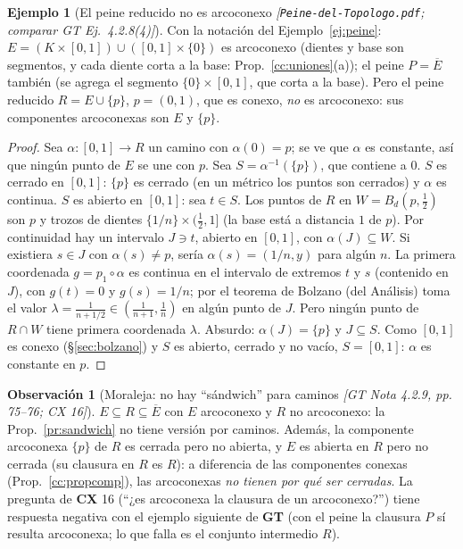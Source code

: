 \documentclass[11pt,a4paper]{article}
\theoremstyle{definition}
\newtheorem{ejemplo}[definicion]{Ejemplo}
\newtheorem{observacion}[definicion]{Observación}
\theoremstyle{plain}
\newcommand{\fnt}[1]{{\normalfont\small\itshape\color{gray!150!black}[#1]}}
\newcommand{\cl}[1]{\overline{#1}}
\newcommand{\Bola}[2]{B_d(#1,#2)}
\begin{document}
\begin{ejemplo}[El peine reducido no es arcoconexo \fnt{\texttt{Peine-del-Topologo.pdf}; comparar GT Ej.\ 4.2.8(4)}]\label{cc:peinered}
Con la notación del Ejemplo~\ref{ej:peine}: $E=(K\times[0,1])\cup([0,1]\times\{0\})$ es arcoconexo (dientes y base son segmentos, y cada diente corta a la base: Prop.~\ref{cc:uniones}(a)); el peine $P=\cl E$ también (se agrega el segmento $\{0\}\times[0,1]$, que corta a la base). Pero el peine reducido $R=E\cup\{p\}$, $p=(0,1)$, que es conexo, \emph{no} es arcoconexo: sus componentes arcoconexas son $E$ y $\{p\}$.
\end{ejemplo}

\begin{proof}
Sea $\alpha:[0,1]\to R$ un camino con $\alpha(0)=p$; se ve que $\alpha$ es constante, así que ningún punto de $E$ se une con $p$. Sea $S=\alpha^{-1}(\{p\})$, que contiene a $0$.
$S$ es cerrado en $[0,1]$: $\{p\}$ es cerrado (en un métrico los puntos son cerrados) y $\alpha$ es continua.
$S$ es abierto en $[0,1]$: sea $t\in S$. Los puntos de $R$ en $W=\Bola{p}{\frac12}$ son $p$ y trozos de dientes $\{1/n\}\times(\frac12,1]$ (la base está a distancia $1$ de $p$). Por continuidad hay un intervalo $J\ni t$, abierto en $[0,1]$, con $\alpha(J)\subseteq W$. Si existiera $s\in J$ con $\alpha(s)\ne p$, sería $\alpha(s)=(1/n,y)$ para algún $n$. La primera coordenada $g=p_1\circ\alpha$ es continua en el intervalo de extremos $t$ y $s$ (contenido en $J$), con $g(t)=0$ y $g(s)=1/n$; por el teorema de Bolzano (del Análisis) toma el valor $\lambda=\frac{1}{n+1/2}\in(\frac1{n+1},\frac1n)$ en algún punto de $J$. Pero ningún punto de $R\cap W$ tiene primera coordenada $\lambda$. Absurdo: $\alpha(J)=\{p\}$ y $J\subseteq S$.
Como $[0,1]$ es conexo (\S\ref{sec:bolzano}) y $S$ es abierto, cerrado y no vacío, $S=[0,1]$: $\alpha$ es constante en $p$.
\end{proof}

\begin{observacion}[Moraleja: no hay ``sándwich'' para caminos \fnt{GT Nota 4.2.9, pp.\,75--76; CX 16}]\label{cc:nosandwich}
$E\subseteq R\subseteq\cl E$ con $E$ arcoconexo y $R$ no arcoconexo: la Prop.~\ref{pr:sandwich} no tiene versión por caminos. Además, la componente arcoconexa $\{p\}$ de $R$ es cerrada pero no abierta, y $E$ es abierta en $R$ pero no cerrada (su clausura en $R$ es $R$): a diferencia de las componentes conexas (Prop.~\ref{cc:propcomp}), las arcoconexas \emph{no tienen por qué ser cerradas}. La pregunta de \textbf{CX} 16 (``¿es arcoconexa la clausura de un arcoconexo?'') tiene respuesta negativa con el ejemplo siguiente de \textbf{GT} (con el peine la clausura $P$ sí resulta arcoconexa; lo que falla es el conjunto intermedio $R$).
\end{observacion}
\end{document}

